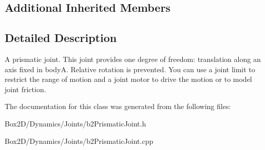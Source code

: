 \subsection*{Additional Inherited Members}


\subsection{Detailed Description}
A prismatic joint. This joint provides one degree of freedom\+: translation along an axis fixed in bodyA. Relative rotation is prevented. You can use a joint limit to restrict the range of motion and a joint motor to drive the motion or to model joint friction. 

The documentation for this class was generated from the following files\+:\begin{DoxyCompactItemize}
\item 
Box2\+D/\+Dynamics/\+Joints/b2\+Prismatic\+Joint.\+h\item 
Box2\+D/\+Dynamics/\+Joints/b2\+Prismatic\+Joint.\+cpp\end{DoxyCompactItemize}
